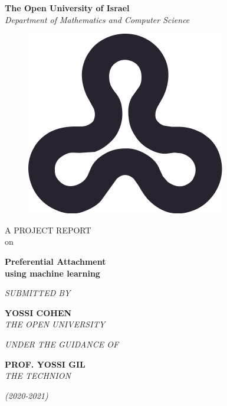 \documentclass[a4paper, 12pt]{report}
\begin{document}
\newenvironment{frontmatter}{}{}
\begin{frontmatter}

\begin{titlepage}

\begin{center}
\large\textbf{The Open University of Israel}\\
\textit{Department of Mathematics and Computer Science}

\begin{center}
\begin{figure}[!ht]
\centering
\includegraphics[width=0.3\linewidth]{./logo}
\end{figure}
\end{center}

\textup{\large A PROJECT REPORT\\on}

\begin{LARGE}
{\textbf {Preferential Attachment\\using machine learning}}
\end{LARGE}

\textit{SUBMITTED BY}

\begin{large}\textbf{YOSSI COHEN}\\\textit{THE OPEN UNIVERSITY}\end{large}

\textit{UNDER THE GUIDANCE OF}

\begin{large}\textbf{PROF. YOSSI GIL}\\\textit{THE TECHNION}\end{large}

\begin{large}\textit{(2020-2021)}\end{large}

\end{center}
\end{titlepage}


\end{frontmatter}
\end{document}
